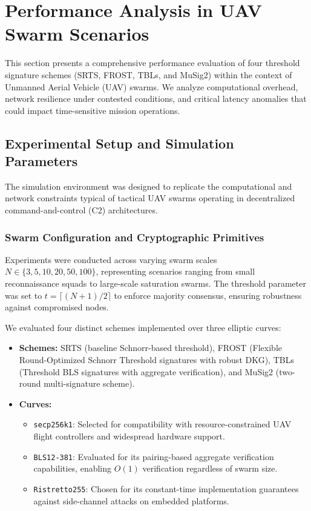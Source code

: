 \section{Performance Analysis in UAV Swarm Scenarios}
\label{sec:performance_analysis}

This section presents a comprehensive performance evaluation of four threshold signature schemes (SRTS, FROST, TBLs, and MuSig2) within the context of Unmanned Aerial Vehicle (UAV) swarms. We analyze computational overhead, network resilience under contested conditions, and critical latency anomalies that could impact time-sensitive mission operations.

\subsection{Experimental Setup and Simulation Parameters}
\label{subsec:experimental_setup}

The simulation environment was designed to replicate the computational and network constraints typical of tactical UAV swarms operating in decentralized command-and-control (C2) architectures.

\subsubsection{Swarm Configuration and Cryptographic Primitives}
Experiments were conducted across varying swarm scales $N \in \{3, 5, 10, 20, 50, 100\}$, representing scenarios ranging from small reconnaissance squads to large-scale saturation swarms. The threshold parameter was set to $t = \lceil (N+1)/2 \rceil$ to enforce majority consensus, ensuring robustness against compromised nodes. 

We evaluated four distinct schemes implemented over three elliptic curves:
\begin{itemize}
    \item \textbf{Schemes:} SRTS (baseline Schnorr-based threshold), FROST (Flexible Round-Optimized Schnorr Threshold signatures with robust DKG), TBLs (Threshold BLS signatures with aggregate verification), and MuSig2 (two-round multi-signature scheme).
    \item \textbf{Curves:} 
    \begin{itemize}
        \item \texttt{secp256k1}: Selected for compatibility with resource-constrained UAV flight controllers and widespread hardware support.
        \item \texttt{BLS12-381}: Evaluated for its pairing-based aggregate verification capabilities, enabling $O(1)$ verification regardless of swarm size.
        \item \texttt{Ristretto255}: Chosen for its constant-time implementation guarantees against side-channel attacks on embedded platforms.
    \end{itemize}
\end{itemize}

